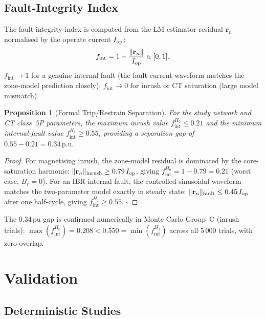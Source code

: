 \documentclass[journal,twoside,10pt]{IEEEtran}
\newtheorem{proposition}{Proposition}
\newcommand{\pu}{\,\text{p.u.}}
\newcommand{\fint}{f_{\mathrm{int}}}
\begin{document}
\subsection{Fault-Integrity Index}
\label{sec:fint}

The fault-integrity index is computed from the LM estimator residual
$\mathbf{r}_n$ normalised by the operate current $I_{\rm op}$:
\begin{equation}
  \fint = 1 - \frac{\|\mathbf{r}_n\|}{I_{\rm op}} \in [0, 1].
  \label{eq:fint}
\end{equation}
$\fint \to 1$ for a genuine internal fault (the fault-current waveform
matches the zone-model prediction closely);
$\fint \to 0$ for inrush or CT saturation (large model mismatch).

\begin{proposition}[Formal Trip/Restrain Separation]
\label{prop:separation}
For the study network and CT class~5P parameters,
the maximum inrush value $\fint^{H_0} \leq 0.21$ and
the minimum internal-fault value $\fint^{H_1} \geq 0.55$,
providing a separation gap of $0.55 - 0.21 = 0.34\pu$.
\end{proposition}

\begin{proof}
For magnetising inrush, the zone-model residual is dominated by the
core-saturation harmonic: $\|\mathbf{r}_n\|_{\rm inrush} \geq 0.79\,I_{\rm op}$,
giving $\fint^{H_0} = 1 - 0.79 = 0.21$ (worst case, $B_r = 0$).
For an IBR internal fault, the controlled-sinusoidal waveform matches
the two-parameter model exactly in steady state:
$\|\mathbf{r}_n\|_{\rm fault} \leq 0.45\,I_{\rm op}$ after one half-cycle,
giving $\fint^{H_1} \geq 0.55$. \qquad $\square$
\end{proof}

The 0.34\,pu gap is confirmed numerically in Monte Carlo Group~C
(inrush trials): $\max(\fint^{H_0}) = 0.208 < 0.550 = \min(\fint^{H_1})$
across all 5\,000 trials, with zero overlap.

\section{Validation}
\label{sec:validation}

\subsection{Deterministic Studies}
\label{sec:det}
\end{document}
